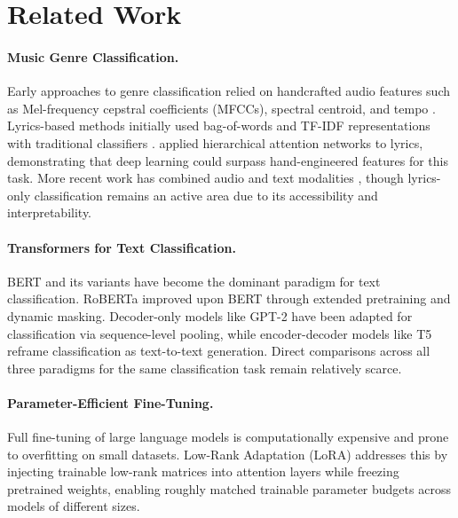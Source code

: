\documentclass[11pt,a4paper]{article}
\begin{document}
\section{Related Work}
\label{sec:related}

\paragraph{Music Genre Classification.}
Early approaches to genre classification relied on handcrafted audio
features such as Mel-frequency cepstral coefficients (MFCCs), spectral
centroid, and tempo \citep{tzanetakis2002musical}.
Lyrics-based methods initially used bag-of-words and TF-IDF
representations with traditional classifiers
\citep{fell2014lyrics}.
\citet{tsaptsinos2017lyrics} applied hierarchical attention networks
to lyrics, demonstrating that deep learning could surpass hand-engineered
features for this task.
More recent work has combined audio and text modalities
\citep{oramas2018multimodal}, though lyrics-only classification remains
an active area due to its accessibility and interpretability.

\paragraph{Transformers for Text Classification.}
BERT \citep{devlin2019bert} and its variants have become the dominant
paradigm for text classification.
RoBERTa \citep{liu2019roberta} improved upon BERT through extended
pretraining and dynamic masking.
Decoder-only models like GPT-2 \citep{radford2019language} have been
adapted for classification via sequence-level pooling, while
encoder-decoder models like T5 \citep{raffel2020exploring} reframe
classification as text-to-text generation.
Direct comparisons across all three paradigms for the same
classification task remain relatively scarce.

\paragraph{Parameter-Efficient Fine-Tuning.}
Full fine-tuning of large language models is computationally expensive
and prone to overfitting on small datasets.
Low-Rank Adaptation (LoRA) \citep{hu2022lora} addresses this by
injecting trainable low-rank matrices into attention layers while
freezing pretrained weights, enabling roughly matched trainable
parameter budgets across models of different sizes.
\end{document}
